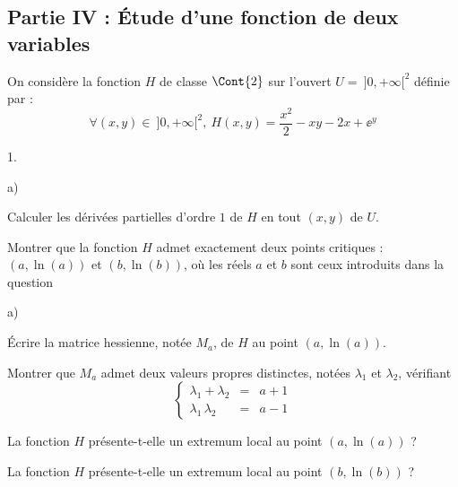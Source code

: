 

\subsection*{Partie IV : Étude d'une fonction de deux variables}

\noindent
On considère la fonction $H$ de classe $\Cont{2}$ sur l'ouvert $U = \
]0,+\infty[^2$ définie par :
\[
  \forall (x,y) \in \ ]0,+\infty[^2, \ H(x,y) = \dfrac{x^2}{2} -xy-2x 
  + \ee^y
\]



\begin{noliste}{1.}
  \setlength{\itemsep}{4mm}
  \setcounter{enumi}{12}
  \item 
  \begin{noliste}{a)}
    \setlength{\itemsep}{2mm}
    \item Calculer les dérivées partielles d'ordre $1$ de $H$ en tout 
    $(x,y)$ de $U$.
    
    
    
    
    
    
    \item Montrer que la fonction $H$ admet exactement deux points 
    critiques : $(a, \ln(a))$ et $(b,\ln(b))$, où les réels $a$ et $b$
    sont ceux introduits dans la question \itbf{2.}
    
    
  \end{noliste}
  
  
  \item 
  \begin{noliste}{a)}
    \setlength{\itemsep}{2mm}
    \item Écrire la matrice hessienne, notée $M_a$, de $H$ au point
    $(a,\ln(a))$.
    
    

    
    \item Montrer que $M_a$ admet deux valeurs propres distinctes, 
    notées $\lambda_1$ et $\lambda_2$, vérifiant 
    \[
      \left\{
      \begin{array}{ccc}
        \lambda_1 + \lambda_2 & = & a+1\\
        \lambda_1 \, \lambda_2 & = & a-1
      \end{array}
      \right.
    \]
    
    
    
    
    \item La fonction $H$ présente-t-elle un extremum local au point
    $(a,\ln(a))$ ?
    
    
  \end{noliste}
  
  
  \item La fonction $H$ présente-t-elle un extremum local au point 
  $(b,\ln(b))$ ?
  
  
\end{noliste}





